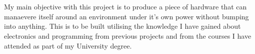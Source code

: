 \\\\My main objective with this project is to produce a piece of hardware that can manaevere itself around an environment under it's own power without bumping into anything.  This is to be built utilising the knowledge I have gained about electronics and programming from previous projects and from the courses I have attended as part of my University degree.
